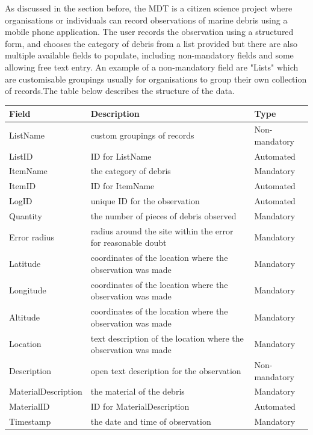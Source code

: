 \documentclass[10pt]{article}\usepackage[]{graphicx}\usepackage[]{color}
\begin{document}
As discussed in the section before, the MDT is a citizen science project where organisations or individuals can record observations of marine debris using a mobile phone application. \cite{JAMBECK2015B} The user records the observation using a structured form, and chooses the category of debris from a list provided but there are also multiple available fields to populate, including non-mandatory fields and some allowing free text entry. An example of a non-mandatory field are "Lists" which are customisable groupings usually for organisations to group their own collection of records.The table below describes the structure of the data. 

\begin{table}[H]
\begin{tabular}{ l l l }
Field & Description & Type \\
\hline
ListName & custom groupings of records & Non-mandatory \\
ListID & ID for ListName & Automated \\
ItemName & the category of debris & Mandatory \\
ItemID & ID for ItemName & Automated \\
LogID & unique ID for the observation & Automated \\
Quantity & the number of pieces of debris observed & Mandatory \\
Error radius & radius around the site within the error for reasonable doubt & Mandatory \\
Latitude & coordinates of the location where the observation was made & Mandatory \\
Longitude & coordinates of the location where the observation was made & Mandatory \\
Altitude & coordinates of the location where the observation was made & Mandatory \\
Location & text description of the location where the observation was made & Mandatory \\
Description & open text description for the observation & Non-mandatory \\
MaterialDescription & the material of the debris & Mandatory \\
MaterialID & ID for MaterialDescription & Automated \\
Timestamp & the date and time of observation & Mandatory \\
\end{tabular}
\end{table}
\end{document}
